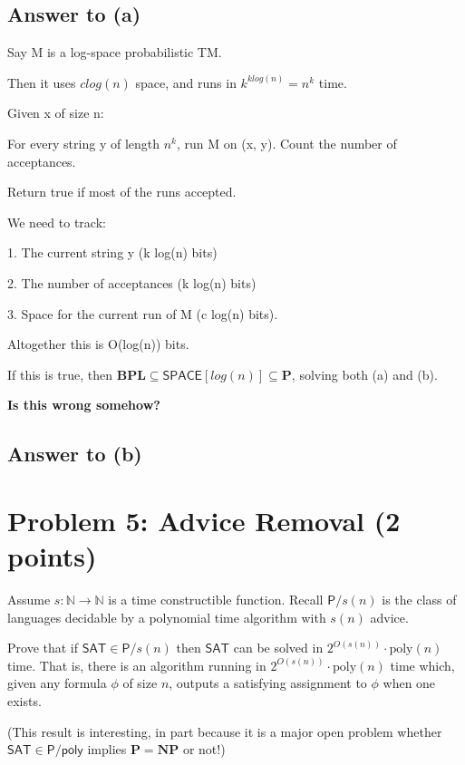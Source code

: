 \documentclass{article}
\renewcommand{\P}{\mathbf{P}}
\newcommand{\NP}{\mathbf{NP}}
\def \N {{\mathbb N}}
\def \BPL{{\mathbf{BPL}}}
\def \poly{\text{poly}}
\begin{document}
\subsection*{Answer to (a)}

Say M is a log-space probabilistic TM.

Then it uses $c log(n)$ space, and runs in $k^{k log(n)} = n^k$
time.

Given x of size n:

For every string y of length $n^k$, run M on (x, y).
Count the number of acceptances.

Return true if most of the runs accepted.

We need to track:

1. The current string y (k log(n) bits)

2. The number of acceptances (k log(n) bits)

3. Space for the current run of M (c log(n) bits).

Altogether this is O(log(n)) bits.

If this is true, then $\BPL \subseteq \textsf{SPACE}[log(n)] \subseteq \P$, solving both (a) and (b).

\textbf{Is this wrong somehow?}








\subsection*{Answer to (b)}



\newpage
\section*{Problem 5: Advice Removal (2 points)}

Assume $s : \N \rightarrow \N$ is a time constructible function. Recall $\mathsf{P}/s(n)$ is the class of languages decidable by a polynomial time algorithm with $s(n)$ advice. 

Prove that if $\textsf{SAT} \in \mathsf{P}/s(n)$ then $\textsf{SAT}$ can be solved in $2^{O(s(n))}\cdot \poly(n)$ time. That is, there is an algorithm running in $2^{O(s(n))}\cdot \poly(n)$ time which, given any formula $\phi$ of size $n$, outputs a satisfying assignment to $\phi$ when one exists.

(This result is interesting, in part because it is a major open problem whether $\textsf{SAT} \in \mathsf{P}/\mathsf{poly}$ implies $\P = \NP$ or not!)
\end{document}
